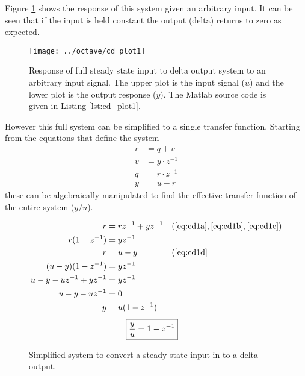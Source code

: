 \documentclass{article}
\begin{document}

Figure \ref{fig:cd_plot1} shows the response of this system given
an arbitrary input.
It can be seen that if the input is held constant the output (delta)
returns to zero as expected.

\begin{figure}[htbp!]
\texttt{[image: ../octave/cd\_plot1]}
\caption{Response of full steady state input to delta output system
to an arbitrary input signal.
The upper plot is the input signal ($u$) and the lower plot is
the output response ($y$).
The Matlab source code is given in Listing \ref{lst:cd_plot1}.
}
\label{fig:cd_plot1}
\end{figure}

\begin{samepage}
However this full system can be simplified to a single transfer function.
Starting from the equations that define the system
\begin{align}
	r &= q + v \label{eq:cd1a} \\
	v &= y \cdot z^{-1} \label{eq:cd1b} \\
	q &= r \cdot z^{-1} \label{eq:cd1c} \\
	y &= u - r \label{eq:cd1d}
\end{align}
these can be algebraically manipulated to find the effective transfer
function of the entire system ($y/u$).
\end{samepage}

\begin{align*}
	r &= r z^{-1} + y z^{-1} && (\ref{eq:cd1a}, \ref{eq:cd1b}, \ref{eq:cd1c})\\
	r(1 - z^{-1}) &= y z^{-1} \\
	r &= u - y && (\ref{eq:cd1d} \\
	(u - y)(1 - z^{-1}) &= y z^{-1} \\
	u - y - u z^{-1} + y z^{-1} &= y z^{-1} \\
	u - y - u z^{-1} &= 0 \\
	y &= u (1 - z^{-1})
\end{align*}
\begin{align}
	\Aboxed{ \frac{y}{u} &= 1 - z^{-1} }
\end{align}

\begin{figure}[!htbp]
\begin{center}


\end{center}
\caption{Simplified system to convert a steady state input in to
a delta output.}
\label{fig:cd1s}
\end{figure}
\end{document}
